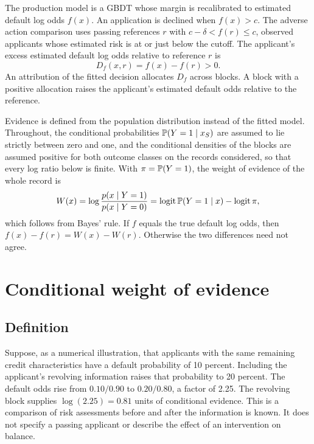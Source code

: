 The production model is a GBDT whose margin is recalibrated to estimated default log odds $f(x)$. An application is declined when $f(x)>c$. The adverse action comparison uses passing references $r$ with $c-\delta<f(r)\le c$, observed applicants whose estimated risk is at or just below the cutoff. The applicant's excess estimated default log odds relative to reference $r$ is
\begin{equation}\label{eq:gap}
D_f(x,r)=f(x)-f(r)>0 .
\end{equation}
An attribution of the fitted decision allocates $D_f$ across blocks. A block with a positive allocation raises the applicant's estimated default odds relative to the reference.

Evidence is defined from the population distribution instead of the fitted model. Throughout, the conditional probabilities $\mathbb P(Y=1\mid x_S)$ are assumed to lie strictly between zero and one, and the conditional densities of the blocks are assumed positive for both outcome classes on the records considered, so that every log ratio below is finite. With $\pi=\mathbb P(Y=1)$, the weight of evidence of the whole record is
\begin{equation}\label{eq:joint}
W(x)=\log\frac{p(x\mid Y=1)}{p(x\mid Y=0)}=\operatorname{logit}\mathbb P(Y=1\mid x)-\operatorname{logit}\pi ,
\end{equation}
which follows from Bayes' rule. If $f$ equals the true default log odds, then $f(x)-f(r)=W(x)-W(r)$. Otherwise the two differences need not agree.

\section{Conditional weight of evidence}\label{sec:evidence}

\subsection{Definition}

Suppose, as a numerical illustration, that applicants with the same remaining credit characteristics have a default probability of 10 percent. Including the applicant's revolving information raises that probability to 20 percent. The default odds rise from $0.10/0.90$ to $0.20/0.80$, a factor of 2.25. The revolving block supplies $\log(2.25)=0.81$ units of conditional evidence. This is a comparison of risk assessments before and after the information is known. It does not specify a passing applicant or describe the effect of an intervention on balance.

